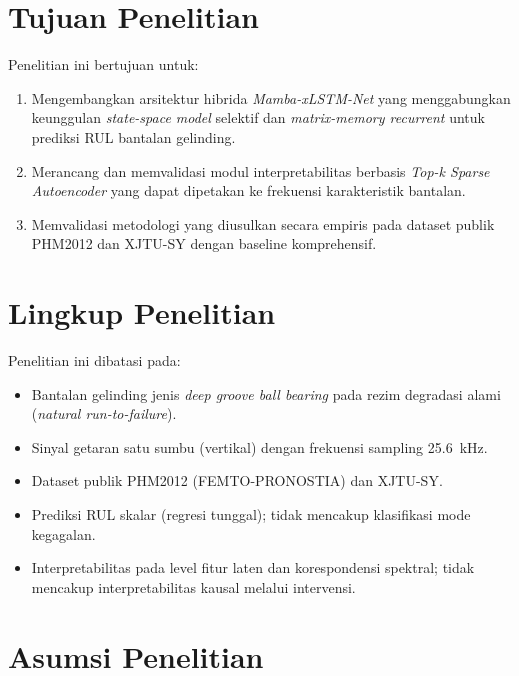 \section{Tujuan Penelitian}
\label{subsec:bab1_tujuan}

Penelitian ini bertujuan untuk:

\begin{enumerate}
  \item Mengembangkan arsitektur hibrida \emph{Mamba-xLSTM-Net} yang
        menggabungkan keunggulan \emph{state-space model} selektif
        dan \emph{matrix-memory recurrent} untuk prediksi RUL
        bantalan gelinding.
  \item Merancang dan memvalidasi modul interpretabilitas berbasis
        \emph{Top-k Sparse Autoencoder} yang dapat dipetakan ke
        frekuensi karakteristik bantalan.
  \item Memvalidasi metodologi yang diusulkan secara empiris pada
        dataset publik PHM2012 dan XJTU-SY dengan baseline
        komprehensif.
\end{enumerate}

\section{Lingkup Penelitian}
\label{subsec:bab1_lingkup}

Penelitian ini dibatasi pada:

\begin{itemize}
  \item Bantalan gelinding jenis \emph{deep groove ball bearing} pada
        rezim degradasi alami (\emph{natural run-to-failure}).
  \item Sinyal getaran satu sumbu (vertikal) dengan frekuensi sampling
        \SI{25.6}{\kilo\hertz}.
  \item Dataset publik PHM2012 (FEMTO-PRONOSTIA) dan XJTU-SY.
  \item Prediksi RUL skalar (regresi tunggal); tidak mencakup
        klasifikasi mode kegagalan.
  \item Interpretabilitas pada level fitur laten dan korespondensi
        spektral; tidak mencakup interpretabilitas kausal melalui
        intervensi.
\end{itemize}

\section{Asumsi Penelitian}
\label{subsec:bab1_asumsi}

